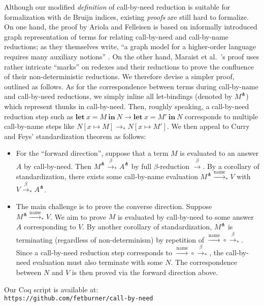 \documentclass[english]{sumiilab-paper}
\newcommand{\LET}[3]{\mathbf{let}~#1=#2~\mathbf{in}~#3}
\newcommand{\EXPANDLET}[1]{#1^\pitchfork}
\newcommand{\FULLBETA}{\xrightarrow{\beta}}
\newcommand{\CALLBYNAME}{\xrightarrow{\mathrm{name}}}
\newcommand{\RTCLOS}[1]{#1_*}
\begin{document}
Although our modified \emph{definition} of call-by-need reduction is suitable for formalization with de Bruijn indices, existing \emph{proofs} are still hard to formalize.  On one hand, the proof by Ariola and Felleisen \cite{Ariola97} is based on informally introduced graph representation of terms for relating call-by-need and call-by-name reductions; as they themselves write, ``a graph model for a higher-order language requires many auxiliary notions'' \cite[p. 3]{Ariola97}.  On the other hand, Maraist et al.~\cite{Maraist98}'s proof uses rather intricate ``marks'' on redexes and their reductions to prove the confluence of their non-deterministic reductions.
We therefore devise a simpler proof, outlined as follows.  As for the correspondence between terms during call-by-name and call-by-need reductions, we simply inline all let-bindings (denoted by $\EXPANDLET{M}$) which represent thunks in call-by-need.  Then, roughly speaking, a call-by-need reduction step such as $\LET{x}{M}{N} \rightarrow \LET{x}{M'}{N}$ corresponds to multiple call-by-name steps like $N[x \mapsto M] \rightarrow_* N[x \mapsto M']$.  We then appeal to Curry and Feys' standardization theorem \cite{Barendregt-84} as follows:
\begin{itemize}
	\item For the ``forward direction'', suppose that a term $M$ is evaluated to an answer $A$ by call-by-need.  Then $\EXPANDLET{M}\RTCLOS{\FULLBETA}\EXPANDLET{A}$ by full $\beta$-reduction $\FULLBETA$.  By a corollary of standardization, there exists some call-by-name evaluation $\EXPANDLET{M}\RTCLOS{\CALLBYNAME}V$ with $V\RTCLOS{\FULLBETA}\EXPANDLET{A}$.
	\item The main challenge is to prove the converse direction.  Suppose \\$\EXPANDLET{M} \RTCLOS{\CALLBYNAME}V$.  We aim to prove $M$ is evaluated by call-by-need to some answer $A$ corresponding to $V$.  By another corollary of standardization,
		$\EXPANDLET{M}$ is terminating (regardless of non-determinism) by repetition of ${\CALLBYNAME}\circ{\RTCLOS{\FULLBETA}}$.
		Since a call-by-need reduction step corresponds to ${\CALLBYNAME}\circ{\RTCLOS{\FULLBETA}}$, the call-by-need evaluation must also terminate with some $N$.
		The correspondence between $N$ and $V$ is then proved via the forward direction above.
\end{itemize}
%
Our Coq script is available at:\\ \verb|https://github.com/fetburner/call-by-need|
\end{document}
